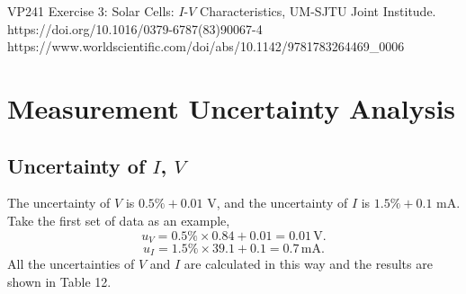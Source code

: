\documentclass{article}
\begin{document}
{\begin{thebibliography}{1}
     VP241 Exercise 3: Solar Cells: $I$-$V$ Characteristics, UM-SJTU Joint Institude.
     https://doi.org/10.1016/0379-6787(83)90067-4
     https://www.worldscientific.com/doi/abs/10.1142/9781783264469\_0006

\end{thebibliography}

\newpage

\appendix

\section{Measurement Uncertainty Analysis}

\subsection{Uncertainty of $I$, $V$}
The uncertainty of $V$ is $0.5\%+0.01$ V, and the uncertainty of $I$ is $1.5\%+0.1$ mA. Take the first set of data as an example,
$$u_{V} = 0.5\% \times 0.84 + 0.01 = 0.01\,\text{V}.$$
$$u_{I} = 1.5\% \times 39.1 + 0.1 = 0.7\,\text{mA}.$$
All the uncertainties of $V$ and $I$ are calculated in this way and the results are shown in Table 12.

}
\end{document}
